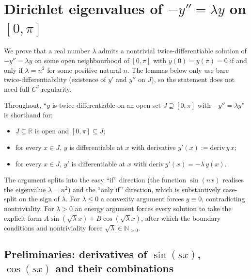 


\section{Dirichlet eigenvalues of $-y'' = \lambda y$ on $[0,\pi]$}

We prove that a real number $\lambda$ admits a nontrivial twice-differentiable
solution of $-y'' = \lambda y$ on some open neighbourhood of $[0,\pi]$ with
$y(0) = y(\pi) = 0$ if and only if $\lambda = n^2$ for some positive natural $n$.
The lemmas below only use bare twice-differentiability (existence of $y'$ and
$y''$ on $J$), so the statement does not need full $C^2$ regularity.

Throughout, ``$y$ is twice differentiable on an open set $J \supseteq [0,\pi]$
with $-y'' = \lambda y$'' is shorthand for:
\begin{itemize}
    \item $J \subseteq \mathbb{R}$ is open and $[0,\pi] \subseteq J$;
    \item for every $x \in J$, $y$ is differentiable at $x$ with derivative
        $y'(x) := \mathrm{deriv}\, y\, x$;
    \item for every $x \in J$, $y'$ is differentiable at $x$ with
        $\mathrm{deriv}\, y'(x) = -\lambda \, y(x)$.
\end{itemize}

The argument splits into the easy ``if'' direction (the function $\sin(nx)$
realises the eigenvalue $\lambda = n^2$) and the ``only if'' direction, which is
substantively case-split on the sign of $\lambda$. For $\lambda \le 0$ a
convexity argument forces $y \equiv 0$, contradicting nontriviality. For
$\lambda > 0$ an energy argument forces every solution to take the explicit form
$A\sin(\sqrt{\lambda}x) + B\cos(\sqrt{\lambda}x)$, after which the boundary
conditions and nontriviality force $\sqrt{\lambda} \in \mathbb{N}_{>0}$.

\subsection{Preliminaries: derivatives of $\sin(sx)$, $\cos(sx)$ and their combinations}

